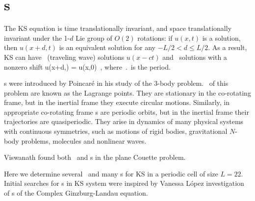 
\section{\Rpo s}

The KS equation   is time translationally invariant,
and
space translationally invariant
under the 1-$d$ Lie group of $O(2)$ rotations: if
$u(x,t)$ is a solution, then $u(x+d,t)$ is an equivalent
solution for any $-L/2 < d \leq L/2$.
As a result,
KS can have \reqva\ (traveling wave) solutions
$u(x-ct)$ and \rpo\ solutions with a nonzero shift
\beq
u(x+d,\period{}) = u(x,0)
\,,
where $\period{}$ is the period.


{\Rpo s} were introduced by Poincar\'e in his study of
the 3-body problem.
\Reqva\ of this problem
are known as the Lagrange points. They are stationary in
the co-rotating frame, but
in the inertial frame they execute circular motions.
Similarly, in appropriate co-rotating frame
{\rpo s} are periodic orbits,
but in the inertial frame their trajectories
are quasiperiodic.
They arise in dynamics of many physical systems
with continuous symmetries, such as motions of rigid bodies, gravitational
$N$-body problems, molecules and nonlinear waves.

Viswanath %
found both \reqva\ and \rpo s in the plane Couette problem.

Here we determine
several \eqva\ and many \rpo s for
KS in a periodic cell of size $L=22$.
Initial searches for \rpo s in KS system were
inspired by Vanessa L{\'o}pez investigation
of {\Rpo s} of the Complex Ginzburg-Landau equation.
